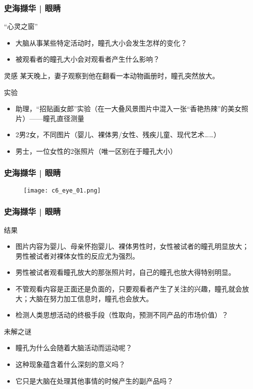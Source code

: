 \begin{frame}
  \frametitle{史海撷华 | 眼睛}
  \begin{block}{“心灵之窗”}
    \begin{itemize}
      \item 大脑从事某些特定活动时，瞳孔大小会发生怎样的变化？
      \item 被观看者的瞳孔大小会对观看者产生什么影响？
    \end{itemize}
  \end{block}
  \pause
  \begin{block}{灵感}
    某天晚上，妻子观察到他在翻看一本动物画册时，瞳孔突然放大。
  \end{block}
  \pause
  \begin{block}{实验}
    \begin{itemize}
      \item 助理，“招贴画女郎”实验（在一大叠风景图片中混入一张“香艳热辣”的美女照片）——瞳孔直径测量
      \item 2男2女，不同图片（婴儿、裸体男/女性、残疾儿童、现代艺术……）
      \item 男士，一位女性的2张照片（唯一区别在于瞳孔大小）
    \end{itemize}
  \end{block}
\end{frame}

\begin{frame}
  \frametitle{史海撷华 | 眼睛}
  \begin{figure}
    \centering
    \texttt{[image: c6\_eye\_01.png]}
  \end{figure}
\end{frame}

\begin{frame}
  \frametitle{史海撷华 | 眼睛}
  \begin{block}{结果}
    \begin{itemize}
      \item 图片内容为婴儿、母亲怀抱婴儿、裸体男性时，女性被试者的瞳孔明显放大；男性被试者对裸体女性的反应尤为强烈。
      \item 男性被试者观看瞳孔放大的那张照片时，自己的瞳孔也放大得特别明显。
      \item 不管观看内容是正面还是负面的，只要观看者产生了关注的兴趣，瞳孔就会放大；大脑在努力加工信息时，瞳孔也会放大。
      \item 检测人类思想活动的终极手段（性取向，预测不同产品的市场价值）？
    \end{itemize}
  \end{block}
  \pause
  \begin{block}{未解之谜}
    \begin{itemize}
      \item 瞳孔为什么会随着大脑活动而运动呢？
      \item 这种现象蕴含着什么深刻的意义吗？
      \item 它只是大脑在处理其他事情的时候产生的副产品吗？
    \end{itemize}
  \end{block}
\end{frame}

